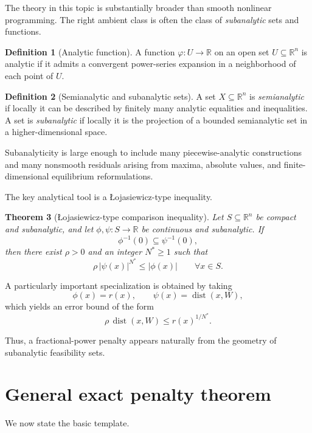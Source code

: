 \documentclass[pdflatex,sn-mathphys-num]{sn-jnl}%
\newtheorem{theorem}{Theorem}[section]
\theoremstyle{definition}
\newtheorem{definition}[theorem]{Definition}
\newcommand{\R}{\mathbb{R}}
\newcommand{\dist}{\operatorname{dist}}
\newcommand{\abs}[1]{\left\lvert #1 \right\rvert}
\begin{document}
The theory in this topic is substantially broader than smooth nonlinear programming. The right ambient class is often the class of \emph{subanalytic} sets and functions.

\begin{definition}[Analytic function]
A function $\varphi:U\to\R$ on an open set $U\subseteq \R^n$ is analytic if it admits a convergent power-series expansion in a neighborhood of each point of $U$.
\end{definition}

\begin{definition}[Semianalytic and subanalytic sets]
A set $X\subseteq \R^n$ is \emph{semianalytic} if locally it can be described by finitely many analytic equalities and inequalities. A set is \emph{subanalytic} if locally it is the projection of a bounded semianalytic set in a higher-dimensional space.
\end{definition}

Subanalyticity is large enough to include many piecewise-analytic constructions and many nonsmooth residuals arising from maxima, absolute values, and finite-dimensional equilibrium reformulations.

The key analytical tool is a Łojasiewicz-type inequality.

\begin{theorem}[Łojasiewicz-type comparison inequality]
\label{thm:loja}
Let $S\subseteq \R^n$ be compact and subanalytic, and let $\phi,\psi:S\to\R$ be continuous and subanalytic. If
\[
\phi^{-1}(0)\subseteq \psi^{-1}(0),
\]
then there exist $\rho>0$ and an integer $N^\ast\ge 1$ such that
\[
\rho\,\abs{\psi(x)}^{N^\ast}\le \abs{\phi(x)}\qquad \forall x\in S.
\]
\end{theorem}

A particularly important specialization is obtained by taking
\[
\phi(x)=r(x),\qquad \psi(x)=\dist(x,W),
\]
which yields an error bound of the form
\begin{equation}
\label{eq:generic-error-bound}
\rho\,\dist(x,W)\le r(x)^{1/N^\ast}.
\end{equation}

Thus, a fractional-power penalty appears naturally from the geometry of subanalytic feasibility sets.

\section{General exact penalty theorem}

We now state the basic template.
\end{document}
